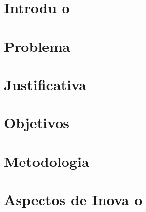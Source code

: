 \documentclass{article}
\begin{document}

          
            \chapter{Introdu o}\label{cap:introducao}

            
            \chapter{Problema}\label{cap:problema}


            \chapter{Justificativa}\label{cap:justificativa}


            \chapter{Objetivos}\label{cap:objetivos}


            \chapter{Metodologia}\label{cap:metodologia}


            \chapter{Aspectos de Inova o}\label{cap:inovacao}

            
\end{document}

